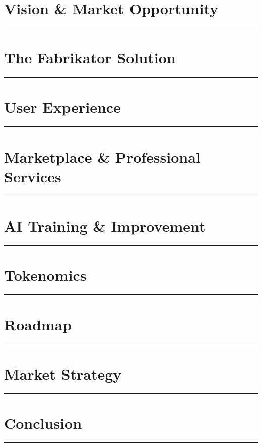 \documentclass[11pt,a4paper]{article}
\newcommand{\fabSectionrule}{
    \vspace{-1ex}
    \noindent\textcolor{fabPrimary}{\rule{\linewidth}{2pt}}
    \vspace{1ex}
}
\begin{document}
\clearpage
\section{Vision \& Market Opportunity}
\fabSectionrule


\clearpage
\section{The Fabrikator Solution}
\fabSectionrule


\clearpage
\section{User Experience}
\fabSectionrule


\clearpage
\section{Marketplace \& Professional Services}
\fabSectionrule


\clearpage
\section{AI Training \& Improvement}
\fabSectionrule


\clearpage
\section{Tokenomics}
\fabSectionrule


\clearpage
\section{Roadmap}
\fabSectionrule


\clearpage
\section{Market Strategy}
\fabSectionrule


\clearpage
\section{Conclusion}
\fabSectionrule

\end{document}
